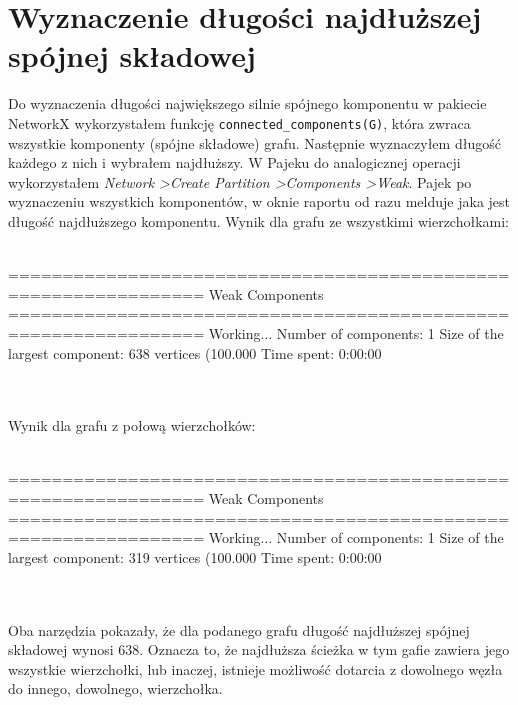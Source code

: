 \documentclass[a4paper,10pt]{article}
\begin{document}
	\section{Wyznaczenie długości najdłuższej spójnej składowej}
	Do wyznaczenia długości największego silnie spójnego komponentu w pakiecie NetworkX wykorzystałem funkcję \texttt{connected\_components(G)}, która zwraca wszystkie komponenty (spójne składowe) grafu. Następnie wyznaczyłem długość każdego z nich i wybrałem najdłuższy. W Pajeku do analogicznej operacji wykorzystałem \textit{Network \textgreater Create Partition \textgreater Components \textgreater Weak}. Pajek po wyznaczeniu wszystkich komponentów, w oknie raportu od razu melduje jaka jest długość najdłuższego komponentu. Wynik dla grafu ze wszystkimi wierzchołkami:\\\\
	\begin{verbbox}
		================================================================
		Weak Components
		================================================================
		 Working...
		 Number of components: 1
		 Size of the largest component: 638 vertices (100.000%
		 Time spent:  0:00:00
	\end{verbbox}
	\fbox{\theverbbox}
	\\\\
	Wynik dla grafu z połową wierzchołków:\\\\
	\begin{verbbox}
		================================================================
		Weak Components
		================================================================
		 Working...
		 Number of components: 1
		 Size of the largest component: 319 vertices (100.000%
		 Time spent:  0:00:00
	\end{verbbox}
	\fbox{\theverbbox}
	\\\\
	Oba narzędzia pokazały, że dla podanego grafu długość najdłuższej spójnej składowej wynosi 638. Oznacza to, że najdłuższa ścieżka w tym gafie zawiera jego wszystkie wierzchołki, lub inaczej, istnieje możliwość dotarcia z dowolnego węzła do innego, dowolnego, wierzchołka.
	\pagebreak
\end{document}
